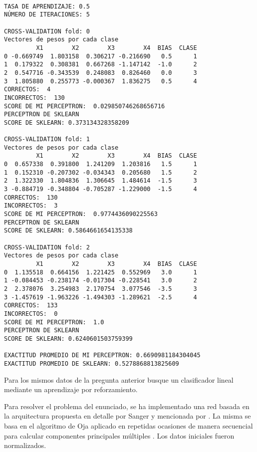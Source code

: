 \documentclass[11pt,spanish,answers]{exam}
\begin{document}
\begin{questions}
\begin{solution}
\begin{verbatim}

TASA DE APRENDIZAJE: 0.5 
NÚMERO DE ITERACIONES: 5

CROSS-VALIDATION fold: 0
Vectores de pesos por cada clase
         X1        X2        X3        X4  BIAS  CLASE
0 -0.669749  1.803158  0.306217 -0.216690   0.5      1
1  0.179322  0.308381  0.667268 -1.147142  -1.0      2
2  0.547716 -0.343539  0.248083  0.826460   0.0      3
3  1.805880  0.255773 -0.000367  1.836275   0.5      4
CORRECTOS:  4
INCORRECTOS:  130
SCORE DE MI PERCEPTRON:  0.029850746268656716
PERCEPTRON DE SKLEARN
SCORE DE SKLEARN: 0.373134328358209

CROSS-VALIDATION fold: 1
Vectores de pesos por cada clase
         X1        X2        X3        X4  BIAS  CLASE
0  0.657338  0.391800  1.241209  1.203816   1.5      1
1  0.152310 -0.207302 -0.034343  0.205680   1.5      2
2  1.322330  1.804836  1.306645  1.484614  -1.5      3
3 -0.884719 -0.348804 -0.705287 -1.229000  -1.5      4
CORRECTOS:  130
INCORRECTOS:  3
SCORE DE MI PERCEPTRON:  0.9774436090225563
PERCEPTRON DE SKLEARN
SCORE DE SKLEARN: 0.5864661654135338

CROSS-VALIDATION fold: 2
Vectores de pesos por cada clase
         X1        X2        X3        X4  BIAS  CLASE
0  1.135518  0.664156  1.221425  0.552969   3.0      1
1 -0.084453 -0.238174 -0.017304 -0.228541   3.0      2
2  2.378076  3.254983  2.170754  3.077546  -3.5      3
3 -1.457619 -1.963226 -1.494303 -1.289621  -2.5      4
CORRECTOS:  133
INCORRECTOS:  0
SCORE DE MI PERCEPTRON:  1.0
PERCEPTRON DE SKLEARN
SCORE DE SKLEARN: 0.6240601503759399

EXACTITUD PROMEDIO DE MI PERCEPTRON: 0.6690981184304045
EXACTITUD PROMEDIO DE SKLEARN: 0.5278868813825609

\end{verbatim}
        
        
    \end{solution}

\question

Para los mismos datos de la pregunta anterior busque un clasificador lineal mediante un aprendizaje por reforzamiento.

    \begin{solution}
    
    Para resolver el problema del enunciado, se ha implementado una red basada en la arquitectura propuesta en detalle por Sanger \cite{Sanger} y mencionada por \cite{componentesPrincipalesReforzamiento}. La misma se basa en el algoritmo de Oja aplicado en repetidas ocasiones de manera secuencial para calcular componentes principales múltiples \cite{componentesPrincipalesReforzamiento}. Los datos iniciales fueron normalizados.
    

\end{solution}
\end{questions}
\end{document}
